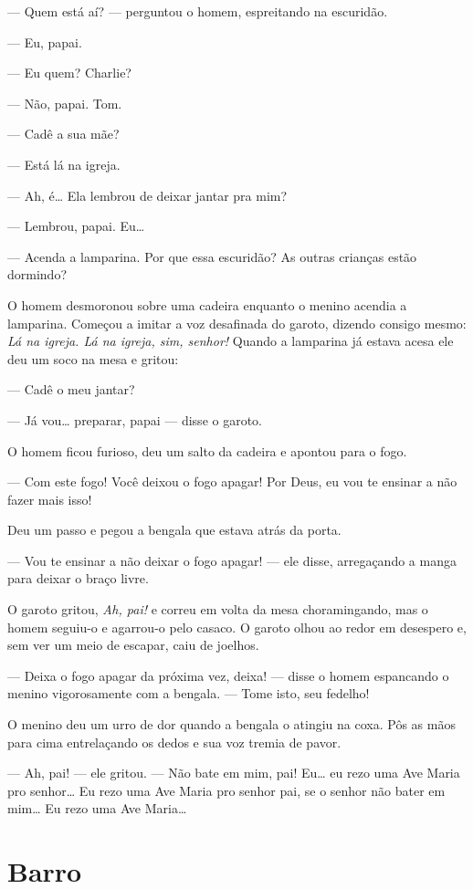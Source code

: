 --- Quem está aí? --- perguntou o homem, espreitando na escuridão.

--- Eu, papai.

--- Eu quem?  Charlie?

--- Não, papai.  Tom.

--- Cadê a sua mãe?

--- Está lá na igreja.

--- Ah, é\ldots{} Ela lembrou de deixar jantar pra mim?

--- Lembrou, papai.  Eu\ldots{}

--- Acenda a lamparina.  Por que essa escuridão?  As outras crianças estão
dormindo?

O homem desmoronou sobre uma cadeira enquanto o menino acendia a lamparina.
Começou a imitar a voz desafinada do garoto, dizendo consigo mesmo: \textit{Lá
na igreja.  Lá na igreja, sim, senhor!} Quando a lamparina já estava acesa ele
deu um soco na mesa e gritou:

--- Cadê o meu jantar?

--- Já vou\ldots{} preparar, papai --- disse o garoto.

O homem ficou furioso, deu um salto da cadeira e apontou para o fogo.

--- Com este fogo!  Você deixou o fogo apagar!  Por Deus, eu vou te ensinar a
não fazer mais isso!

Deu um passo e pegou a bengala que estava atrás da porta.

--- Vou te ensinar a não deixar o fogo apagar! --- ele disse, arregaçando a
manga para deixar o braço livre.

O garoto gritou, \textit{Ah, pai!} e correu em volta da mesa choramingando, mas
o homem seguiu-o e agarrou-o pelo casaco.  O garoto olhou ao redor em desespero
e, sem ver um meio de escapar, caiu de joelhos.

--- Deixa o fogo apagar da próxima vez, deixa! --- disse o homem espancando o
menino vigorosamente com a bengala.  --- Tome isto, seu fedelho!

O menino deu um urro de dor quando a bengala o atingiu na coxa.  Pôs as mãos
para cima entrelaçando os dedos e sua voz tremia de pavor.

--- Ah, pai! --- ele gritou.  --- Não bate em mim, pai!  Eu\ldots{} eu rezo uma
Ave Maria pro senhor\ldots{} Eu rezo uma Ave Maria pro senhor pai, se o senhor
não bater em mim\ldots{} Eu rezo uma Ave Maria\ldots{}


\chapter{Barro}

